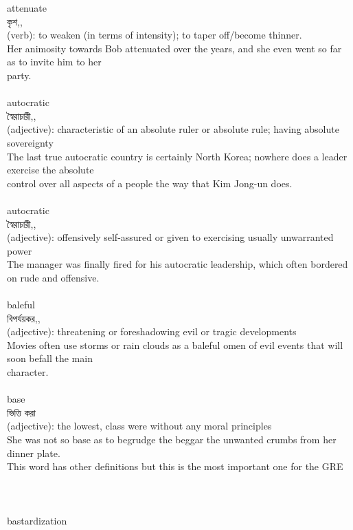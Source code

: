 \documentclass{article}
\begin{document}
{attenuate}\\
{কৃশ,,}\\
{(verb): to weaken (in terms of intensity); to taper off/become thinner.\\Her animosity towards Bob attenuated over the years, and she even went so far as to invite him to her\\party.\\}\\
{autocratic}\\
{স্বৈরাচারী,,}\\
{(adjective): characteristic of an absolute ruler or absolute rule; having absolute sovereignty\\The last true autocratic country is certainly North Korea; nowhere does a leader exercise the absolute\\control over all aspects of a people the way that Kim Jong-un does.\\}\\
{autocratic}\\
{স্বৈরাচারী,,}\\
{(adjective): offensively self-assured or given to exercising usually unwarranted power\\The manager was finally fired for his autocratic leadership, which often bordered on rude and offensive.\\}\\
{baleful}\\
{বিপর্যয়কর,,}\\
{(adjective): threatening or foreshadowing evil or tragic developments\\Movies often use storms or rain clouds as a baleful omen of evil events that will soon befall the main\\character.\\}\\
{base}\\
{ভিত্তি করা}\\
{(adjective): the lowest, class were without any moral principles\\She was not so base as to begrudge the beggar the unwanted crumbs from her dinner plate.\\This word has other definitions but this is the most important one for the GRE\\\\                                                                               \\}\\
{bastardization}\\
\end{document}
